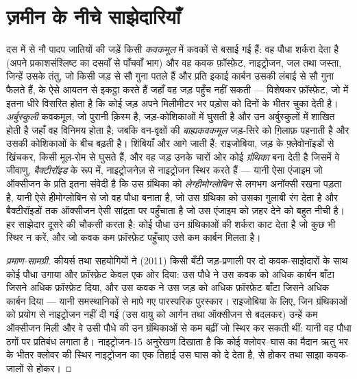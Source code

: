 \section{ज़मीन के नीचे साझेदारियाँ}

\begin{proposition}[कवकमूल और राइजोबिया]\label{prop:b2:living-soil:symbiosis}
दस में से नौ पादप जातियों की जड़ें किसी \emph{कवकमूल} में कवकों से
बसाई गई हैं: वह पौधा शर्करा देता है (अपने प्रकाशसंश्लिष्ट का
दसवाँ से पाँचवाँ भाग) और वह कवक फ़ॉस्फ़ेट, नाइट्रोजन, जल तथा
जस्ता, जिन्हें उसके तंतु, जो किसी जड़ से सौ गुना पतले हैं और
प्रति इकाई कार्बन उसकी लंबाई से सौ गुना फैलते हैं,  के ऐसे आयतन से
इकट्ठा करते हैं जहाँ वह जड़ पहुँच नहीं सकती --- विशेषकर फ़ॉस्फ़ेट,
जो  में इतना धीरे विसरित होता है कि कोई जड़
अपने मिलीमीटर भर पड़ोस को दिनों के भीतर चुका देती है।
\emph{अर्बुस्कुली} कवकमूल, जो पुरानी क़िस्म है, जड़-कोशिकाओं में घुसती है
और उन अर्बुस्कुलों में शाखित होती है जहाँ वह विनिमय होता है;
जबकि वन-वृक्षों की \emph{बाह्यकवकमूल} जड़-सिरे को ग़िलाफ़ पहनाती है और
उसकी कोशिकाओं के बीच बढ़ती है। शिंबियाँ और आगे जाती हैं: राइजोबिया,
जड़ के फ़्लेवोनॉइडों से खिंचकर, किसी मूल-रोम से घुसते हैं, और वह जड़
उनके चारों ओर कोई \emph{ग्रंथिका} बना देती है जिसमें वे जीवाणु,
\emph{बैक्टीरॉइड} के रूप में, नाइट्रोजनेज़ से नाइट्रोजन स्थिर करते हैं --- यानी ऐसा एंजाइम जो
ऑक्सीजन के प्रति इतना संवेदी है कि उस ग्रंथिका को
\emph{लेग्हीमोग्लोबिन} से लगभग अनॉक्सी रखना पड़ता है, यानी ऐसे हीमोग्लोबिन से जो वह पौधा बनाता है, जो
उस ग्रंथिका को उसका गुलाबी रंग देता है और बैक्टीरॉइडों तक ऑक्सीजन
ऐसी सांद्रता पर पहुँचाता है जो उस एंजाइम को ज़हर देने को बहुत नीची है। हर साझेदार
दूसरे की चौकसी करता है: कोई पौधा उन ग्रंथिकाओं की शर्करा काट देता है जो कुछ भी
स्थिर न करें, और जो कवक कम फ़ॉस्फ़ेट पहुँचाए उसे कम
कार्बन मिलता है।
\end{proposition}
\begin{proof}[प्रमाण-सामग्री]
कीयर्स तथा सहयोगियों ने (2011) किसी बँटी जड़-प्रणाली पर दो कवक-साझेदारों के साथ
कोई पौधा उगाया और फ़ॉस्फ़ेट केवल एक ओर दिया:
उस पौधे ने उस कवक को अधिक कार्बन बाँटा जिसने अधिक
फ़ॉस्फ़ेट दिया, और उस कवक ने उस जड़ को अधिक फ़ॉस्फ़ेट बाँटा जिसने
अधिक कार्बन दिया --- यानी समस्थानिकों से मापे गए पारस्परिक पुरस्कार।
राइजोबिया के लिए, जिन ग्रंथिकाओं को प्रयोग से नाइट्रोजन नहीं दी गई (उस
वायु को आर्गन तथा ऑक्सीजन से बदलकर) उन्हें कम ऑक्सीजन मिली और वे
उसी पौधे की उन ग्रंथिकाओं से कम बढ़ीं जो स्थिर कर सकती थीं: यानी वह पौधा
ठगों पर प्रतिबंध लगाता है। नाइट्रोजन-15 अनुरेखण दिखाता है कि कोई क्लोवर--घास
का मैदान ऋतु भर के भीतर क्लोवर की स्थिर नाइट्रोजन का एक तिहाई उस
घास को दे देता है,  से होकर तथा साझा
कवक-जालों से होकर।
\end{proof}

